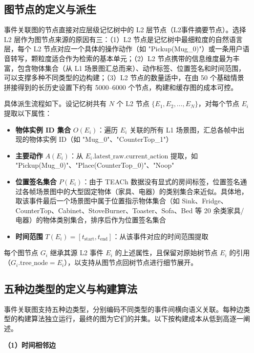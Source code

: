 \subsection{图节点的定义与派生}

事件关联图的节点直接对应层级记忆树中的 L2 层节点（L2事件摘要节点）。选择 L2 层作为图节点来源的原因有三：（1）L2 节点是记忆树中最细粒度的自然语言层，每个 L2 节点对应一个具体的操作动作（如 "Pickup(Mug\_0)"）或一条用户语音转写，颗粒度适合作为检索的基本单元；（2）L2 节点携带的信息维度最为丰富，包含物体集合（从 L1 场景图汇总而来）、动作标签、位置签名和时间范围，可以支撑多种不同类型的边构建；（3）L2 节点的数量适中，在由 50 个基础情景拼接得到的长历史设置下约有 5000–6000 个节点，构建和缓存图的成本可控。

具体派生流程如下。设记忆树共有 $N$ 个 L2 节点 $\{E_1, E_2, \ldots, E_N\}$，对每个节点 $E_i$ 提取以下属性：

\begin{itemize}
\item \textbf{物体实例 ID 集合} $O(E_i)$：遍历 $E_i$ 关联的所有 L1 场景图，汇总各帧中出现的物体实例 ID（如 "Mug\_0"、"CounterTop\_1"）
\item \textbf{主要动作} $A(E_i)$：从 $E_i.\mathrm{latest\_raw}.\mathrm{current\_action}$ 提取，如 "Pickup(Mug\_0)"、"Place(CounterTop\_0)"、"Noop"
\item \textbf{位置签名集合} $P(E_i)$：由于 TEACh 数据没有显式的房间标签，位置签名通过各帧场景图中的大型固定物体（家具、电器）的类别集合来近似。具体地，取该事件最后一个场景图中属于位置指示物体集合（如 Sink、Fridge、CounterTop、Cabinet、StoveBurner、Toaster、Sofa、Bed 等 20 余类家具/电器）的物体类别集合，排序后作为位置签名集合
\item \textbf{时间范围} $T(E_i) = [t_{\mathrm{start}}, t_{\mathrm{end}}]$：从该事件对应的时间范围提取
\end{itemize}

每个图节点 $G_i$ 继承其源 L2 事件 $E_i$ 的上述属性，且保留对原始树节点 $E_i$ 的引用（$G_i.\mathrm{tree\_node} = E_i$），以支持从图节点回树节点进行细节展开。

\subsection{五种边类型的定义与构建算法}

事件关联图支持五种边类型，分别编码不同类型的事件间横向语义关联。每种边类型的构建算法独立运行，最终的图为它们的并集。以下按构建成本从低到高逐一阐述。

\textbf{（1）时间相邻边}

